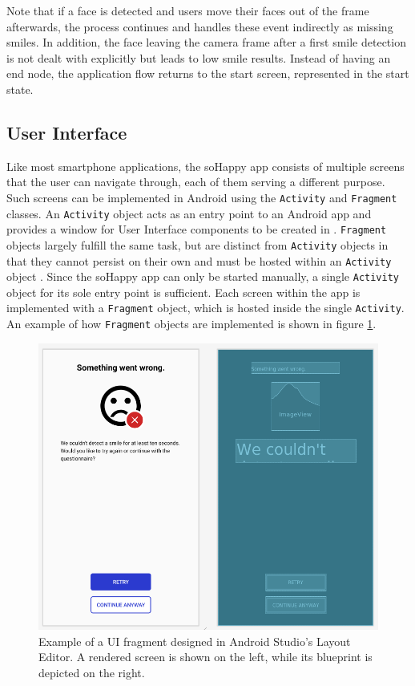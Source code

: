 Note that if a face is detected and users move their faces out of the frame afterwards, the process continues and handles these event indirectly as missing smiles.
In addition, the face leaving the camera frame after a first smile detection is not dealt with explicitly but leads to low smile results.
Instead of having an end node, the application flow returns to the start screen, represented in the start state.

\subsection{User Interface} \label{sec:user_interface}
Like most smartphone applications, the soHappy app consists of multiple screens that the user can navigate through, each of them serving a different purpose. Such screens can be implemented in Android using the \texttt{Activity} and \texttt{Fragment} classes. An \texttt{Activity} object acts as an entry point to an Android app and provides a window for User Interface components to be created in \cite{intro_to_activities}. \texttt{Fragment} objects largely fulfill the same task, but are distinct from \texttt{Activity} objects in that they cannot persist on their own and must be hosted within an \texttt{Activity} object \cite{intro_to_fragments}. Since the soHappy app can only be started manually, a single \texttt{Activity} object for its sole entry point is sufficient. Each screen within the app is implemented with a \texttt{Fragment} object, which is hosted inside the single \texttt{Activity}. An example of how \texttt{Fragment} objects are implemented is shown in figure \ref{fig:user_interface}.

\begin{figure}
  \includegraphics[width=\linewidth]{figures/user_interface.png}
  \caption{Example of a UI fragment designed in Android Studio's Layout Editor. A rendered screen is shown on the left, while its blueprint is depicted on the right.}
  \label{fig:user_interface}
\end{figure}


